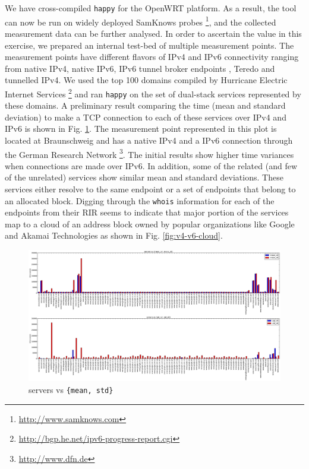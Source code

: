We have cross-compiled \texttt{happy} for the OpenWRT \cite{fainelli:2008}
platform. As a result, the tool can now be run on widely deployed SamKnows
probes \footnote{\url{http://www.samknows.com}}, and the collected measurement
data can be further analysed. In order to ascertain the value in this
exercise, we prepared an internal test-bed of multiple measurement points. The
measurement points have different flavors of IPv4 and IPv6 connectivity
ranging from native IPv4, native IPv6, IPv6 tunnel broker endpoints
\cite{rfc3053}, Teredo \cite{rfc4380} and tunnelled IPv4. We used the top 100
domains compiled by Hurricane Electric Internet Services
\footnote{\url{http://bgp.he.net/ipv6-progress-report.cgi}} and ran
\texttt{happy} on the set of dual-stack services represented by these domains.
A preliminary result comparing the time (mean and standard deviation) to make
a TCP connection to each of these services over IPv4 and IPv6 is shown in Fig.
\ref{fig:happy-servers-mean-std}. The measurement point represented in this
plot is located at Braunschweig and has a native IPv4 and a IPv6 connection
through the German Research Network \footnote{\url{http://www.dfn.de}}. The
initial results show higher time variances when connections are made over
IPv6. In addition, some of the related (and few of the unrelated) services
show similar mean and standard deviations. These services either resolve to
the same endpoint or a set of endpoints that belong to an allocated block.
Digging through the \texttt{whois} information for each of the endpoints from
their \ac{RIR} seems to indicate that major portion of the services map to a
cloud of an address block owned by popular organizations like Google and
Akamai Technologies as shown in Fig. \ref{fig:v4-v6-cloud}.

\begin{figure}[t]
\centering
\includegraphics*[width=1.0\linewidth]{figures/happy-servers-mean-std}
\caption{servers vs \texttt{\{mean, std\}}}
\label{fig:happy-servers-mean-std}
\end{figure}

